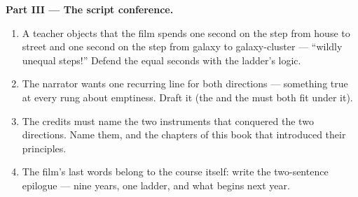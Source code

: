 \begin{problem}
\medskip\noindent\textbf{Part III --- The script
conference.}
\begin{enumerate}[resume]
  \item A teacher objects that the film spends one second
        on the step from house to street and one second on
        the step from galaxy to galaxy-cluster --- ``wildly
        unequal steps!'' Defend the equal seconds with the
        ladder's logic.
  \item The narrator wants one recurring line for both
        directions --- something true at every rung about
        emptiness. Draft it (the  and the 
        must both fit under it).
  \item The credits must name the two instruments that
        conquered the two directions. Name them, and the
        chapters of this book that introduced their
        principles.
  \item The film's last words belong to the course itself:
        write the two-sentence epilogue --- nine years,
        one ladder, and what begins next year.
\end{enumerate}
\end{problem}
